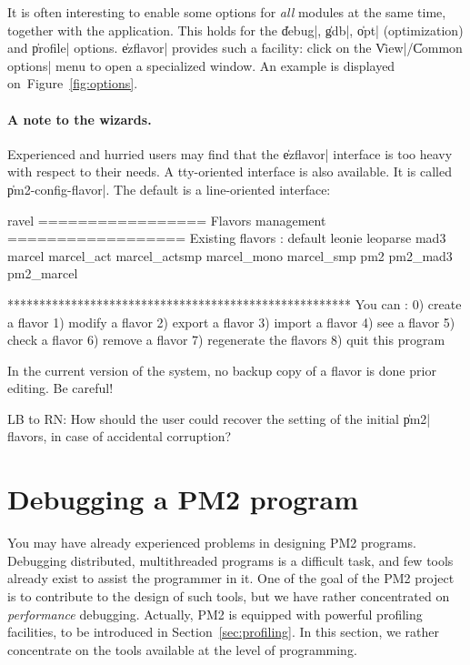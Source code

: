 It is often interesting to enable some options for \emph{all} modules
at the same time, together with the application. This holds for the
\|debug|, \|gdb|, \|opt| (optimization) and \|profile| options.
\|ezflavor| provides such a facility: click on the \|View|/\|Common
options| menu to open a specialized window. An example is displayed
on~Figure~\ref{fig:options}.



\paragraph{A note to the wizards.}

Experienced and hurried users may find that the \|ezflavor| interface is
too heavy with respect to their needs. A tty-oriented  interface is
also available. It is called \|pm2-config-flavor|. The default is a 
line-oriented interface:
\begin{shell}
ravel%
================= Flavors management ==================
Existing flavors :
default leonie leoparse mad3
marcel marcel_act marcel_actsmp marcel_mono marcel_smp 
pm2 pm2_mad3 pm2_marcel

******************************************************
You can :
 0) create a flavor
 1) modify a flavor
 2) export a flavor
 3) import a flavor
 4) see    a flavor
 5) check  a flavor
 6) remove a flavor
 7) regenerate the flavors
 8) quit this program
\end{shell}

\begin{warning}
  In the current version of the system, no backup copy of a flavor is
  done prior editing. Be careful! 
\end{warning}

\begin{note}
  LB to RN: How should the user could recover the setting of the
  initial \|pm2| flavors, in case of accidental corruption?
\end{note}


\section{Debugging a PM2 program}

You may have already experienced problems in designing PM2 programs.
Debugging distributed, multithreaded programs is a difficult task, and
few tools already exist to assist the programmer in it. One of the
goal of the PM2 project is to contribute to the design of such tools,
but we have rather concentrated on \emph{performance} debugging.
Actually, PM2 is equipped with powerful profiling facilities, to be
introduced in Section~\ref{sec:profiling}. In this section, we rather
concentrate on the tools available at the level of programming.

